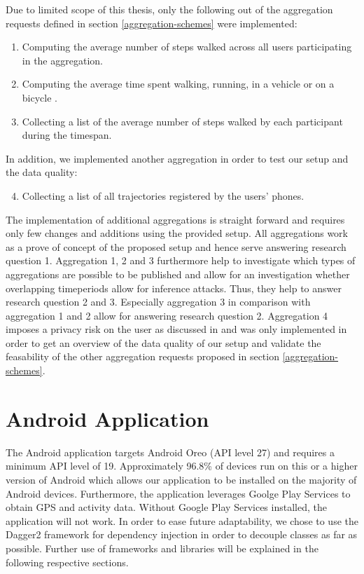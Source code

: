 \begin{samepage}
Due to limited scope of this thesis, only the following out of the aggregation requests defined in section \ref{aggregation-schemes} were implemented:
\begin{enumerate}
	\item Computing the average number of steps walked across all users participating in the aggregation.
	\item Computing the average time spent walking, running, in a vehicle or on a bicycle \parencite{detected-activity}.
	\item Collecting a list of the average number of steps walked by each participant during the timespan.
\end{enumerate}

In addition, we implemented another aggregation in order to test our setup and the data quality:
\begin{enumerate}
  \setcounter{enumi}{3}
  \item Collecting a list of all trajectories registered by the users' phones.
\end{enumerate}
\end{samepage}

The implementation of additional aggregations is straight forward and requires only few changes and additions using the provided setup. All aggregations work as a prove of concept of the proposed setup and hence serve answering research question 1. Aggregation 1, 2 and 3 furthermore help to investigate which types of aggregations are possible to be published and allow for an investigation whether overlapping timeperiods allow for inference attacks. Thus, they help to answer research question 2 and 3. Especially aggregation 3 in comparison with aggregation 1 and 2 allow for answering research question 2.
Aggregation 4 imposes a privacy risk on the user as discussed in \parencite{twitter, cellphone, krumm} and was only implemented in order to get an overview of the data quality of our setup and validate the feasability of the other aggregation requests proposed in section \ref{aggregation-schemes}.

\section{Android Application}\label{android-app}
The Android application targets Android Oreo (API level 27) and requires a minimum API level of 19. Approximately 96.8\% of devices run on this or a higher version of Android \cite{android-api-level-share} which allows our application to be installed on the majority of Android devices.
Furthermore, the application leverages Goolge Play Services to obtain GPS and activity data. Without Google Play Services installed, the application will not work. In order to ease future adaptability, we chose to use the Dagger2 framework \parencite{dagger} for dependency injection in order to decouple classes as far as possible. Further use of frameworks and libraries will be explained in the following respective sections.

